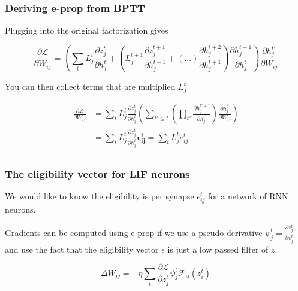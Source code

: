 \documentclass{beamer}
\begin{document}
\begin{frame}[plain]
\frametitle{Deriving e-prop from BPTT} 

Plugging into the original factorization gives

\begin{equation*}
\frac{\partial\mathcal{L}}{\partial W_{ij}} = \left(\sum_{t}L_{j}^{t} \frac{\partial z^{t}_{j}}{\partial h^{t}_{j}}  +  \left(L_{j}^{t+1} \frac{\partial z^{t+1}_{j}}{\partial h^{t+1}_{j}}  + (...) \frac{\partial h^{t+2}_{j}}{\partial h^{t+1}_{j}} \right) \frac{\partial h^{t+1}_{j}}{\partial h^{t}_{j}} \right)\frac{\partial h^{t'}_{j}}{{\partial W_{ij}}} 
\end{equation*}

You can then collect terms that are multiplied $L_{j}^{t}$

\begin{align*}
\frac{\partial\mathcal{L}}{\partial W_{ij}} &= \sum_{t}L_{j}^{t}\frac{\partial z^{t}_{j}}{\partial h^{t}_{j}} \left( \sum_{t'\leq t} \left(\prod_{t'} \frac{\partial h^{t'+1}_{j}}{\partial h^{t'}_{j}} \right)\frac{\partial h^{t'}_{j}}{{\partial W_{ij}}} \right) \\
&= \sum_{t}L_{j}^{t} \frac{\partial z^{t}_{j}}{\partial h^{t}_{j}}\mathbf{\epsilon_{ij}^{t}} = \sum_{t}L_{j}^{t} e_{ij}^{t} \\
\end{align*}

\end{frame}

\begin{frame}[plain]
\frametitle{The eligibility vector for LIF neurons} 

We would like to know the eligibility is per synapse $\epsilon_{ij}^{t}$ for a network of RNN neurons.

Gradients can be computed using e-prop if we use a pseudo-derivative $\psi_{j}^{t} = \frac{\partial z^{t}_{j}}{\partial v^{t}_{j}}$ and use the fact that the eligibility vector $\epsilon$ is just a low passed filter of $z$. 

\begin{equation*}
\Delta W_{ij} = -\eta \sum_{t}\frac{\partial \mathcal{L}}{\partial z_{j}^{t}}\psi_{j}^{t} \mathcal{F}_{\alpha}(z_{i}^{t})
\end{equation*}

\end{frame}
\end{document}
